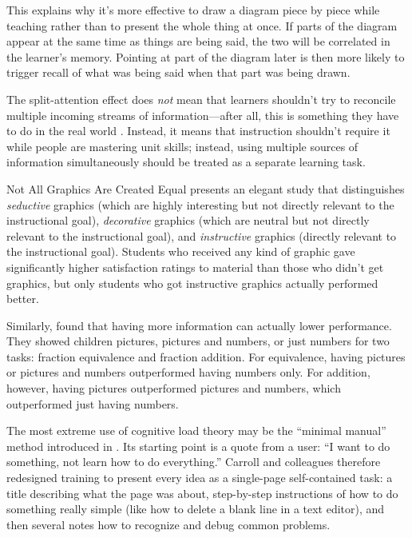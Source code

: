 This explains why it's more effective to draw a diagram piece by piece
while teaching rather than to present the whole thing at once. If parts
of the diagram appear at the same time as things are being said, the two
will be correlated in the learner's memory. Pointing at part of the
diagram later is then more likely to trigger recall of what was being
said when that part was being drawn.

The split-attention effect does \emph{not} mean that learners shouldn't try
to reconcile multiple incoming streams of information---after all, this is
something they have to do in the real world \cite{Atki2000}. Instead,
it means that instruction shouldn't require it while people are
mastering unit skills; instead, using multiple sources of information
simultaneously should be treated as a separate learning task.

\begin{aside}{Not All Graphics Are Created Equal}
  \cite{Sung2012} presents an elegant study that distinguishes
  \emph{seductive} graphics (which are highly interesting but not directly
  relevant to the instructional goal), \emph{decorative} graphics (which are
  neutral but not directly relevant to the instructional goal), and
  \emph{instructive} graphics (directly relevant to the instructional goal).
  Students who received any kind of graphic gave significantly higher
  satisfaction ratings to material than those who didn't get graphics,
  but only students who got instructive graphics actually performed
  better.

  Similarly, \cite{Stam2013,Stam2014} found that having more
  information can actually lower performance. They showed children
  pictures, pictures and numbers, or just numbers for two tasks:
  fraction equivalence and fraction addition. For equivalence, having
  pictures or pictures and numbers outperformed having numbers only. For
  addition, however, having pictures outperformed pictures and numbers,
  which outperformed just having numbers.
\end{aside}


The most extreme use of cognitive load theory may be the ``minimal
manual'' method introduced in \cite{Carr1987}. Its starting point is
a quote from a user: ``I want to do something, not learn how to do
everything.'' Carroll and colleagues therefore redesigned training to
present every idea as a single-page self-contained task: a title
describing what the page was about, step-by-step instructions of how to
do something really simple (like how to delete a blank line in a text
editor), and then several notes how to recognize and debug common
problems.

